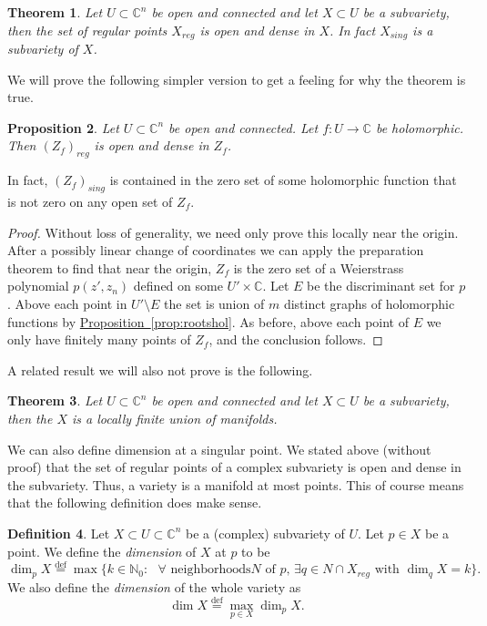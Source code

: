 \documentclass[12pt,openany]{book}
\newcommand{\C}{{\mathbb{C}}}
\newcommand{\N}{{\mathbb{N}}}
\newcommand{\myindex}[1]{#1\index{#1}}
\theoremstyle{plain}
\newtheorem{thm}{Theorem}[section]
\newtheorem{prop}[thm]{Proposition}
\theoremstyle{remark}
\theoremstyle{definition}
\newtheorem{defn}[thm]{Definition}
\theoremstyle{exercise}
\theoremstyle{example}
\newcommand{\propref}[1]{\hyperref[#1]{Proposition~\ref*{#1}}}
\begin{document}
\begin{thm}
Let $U \subset \C^n$ be open and connected and let $X \subset U$
be a subvariety, then the set of regular points $X_{\mathit{reg}}$
is open and dense in $X$.
In fact $X_{\mathit{sing}}$ is a subvariety of $X$.
\end{thm}

We will prove the following simpler version to get a feeling for why the
theorem is true.

\begin{prop}
Let $U \subset \C^n$ be open and connected.
Let $f \colon U \to \C$ be holomorphic.
Then $(Z_f)_{\mathit{reg}}$ is open and dense in $Z_f$.
\end{prop}

In fact,
$(Z_f)_{\mathit{sing}}$ is contained in the zero set of some holomorphic
function that is not zero on any open set of $Z_f$.

\begin{proof}
Without loss of generality,
we need only prove this locally near the origin.  After a possibly
linear change of coordinates we can apply the preparation theorem to find
that near the origin, $Z_f$ is the zero set of a Weierstrass polynomial
$p(z',z_n)$ defined on some $U' \times \C$.
Let $E$ be the discriminant set for $p$.  Above each
point in $U' \setminus E$ the set is union of $m$ distinct graphs
of holomorphic functions by \propref{prop:rootshol}.  As before,
above each point of $E$ we only have finitely many points of $Z_f$,
and the conclusion
follows.
\end{proof}

A related result we will also not prove is the following.

\begin{thm}
Let $U \subset \C^n$ be open and connected and let $X \subset U$
be a subvariety, then the $X$ is a locally finite union of manifolds.
\end{thm}

We can also define dimension at a singular point.
We stated above (without proof) that the set of regular points of a complex
subvariety is open and dense in the subvariety.  Thus, a
variety is a manifold at most points.  This of course means that the 
following definition does make sense.

\begin{defn}
Let $X \subset U \subset \C^n$ be a (complex) subvariety of $U$.  Let $p \in
X$ be a point.  We define the \emph{\myindex{dimension}} of $X$ at $p$
to be
\begin{equation}
\dim_p X \overset{\text{def}}{=}
\max \{ k \in \N_0 : \text{ $\forall$ neighborhoods
$N$ of $p$, $\exists q \in N \cap X_{\mathit{reg}}$ with $\dim_q X = k$} \} .
\end{equation}
We also define the \emph{dimension} of the whole variety as
\begin{equation}
\dim X \overset{\text{def}}{=}
\max_{p \in X} \dim_p X.
\end{equation}
\end{defn}
\end{document}
